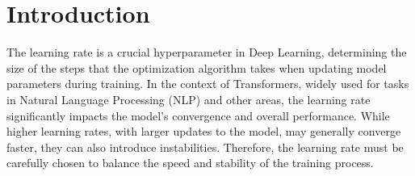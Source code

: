 \documentclass{article}
\theoremstyle{plain}
\theoremstyle{definition}
\theoremstyle{remark}
\newcommand{\comment}[1]{\textcolor{red}{#1}}
\newcommand{\sj}[1]{\textcolor{blue}{[SJ: #1]}}
\begin{document}
    \printAffiliationsAndNotice{\icmlEqualContribution} %
    
    \begin{abstract}
    In this work, we introduce a novel  approach for optimizing neural network training by adjusting learning rates across weights of different components in Transformer models. Traditional methods often apply a uniform learning rate across all network layers, potentially overlooking the unique dynamics of each part. Remarkably, our introduced relative learning rates, RLRS, method accelerates the training process by up to {$23\%$}, particularly in complex models such as Mixture of Experts (MoE). Hyperparameters of RLRS can be efficiently tuned on smaller models and then effectively reused on models up to $27\times$ larger. This simple and effective method results in a substantial reduction in training time and computational resources, offering a practical and scalable solution for optimizing large-scale neural networks.
    \end{abstract}
    
    
    
    \section{Introduction}
    
    The learning rate is a crucial hyperparameter in Deep Learning, determining the size of the steps that the optimization algorithm takes when updating model parameters during training. In the context of Transformers, widely used for tasks in Natural Language Processing (NLP) and other areas, the learning rate significantly impacts the model's convergence and overall performance. While higher learning rates, with larger updates to the model, may generally converge faster, they can also introduce instabilities. Therefore, the learning rate must be carefully chosen to balance the speed and stability of the training process.
    
\end{document}
